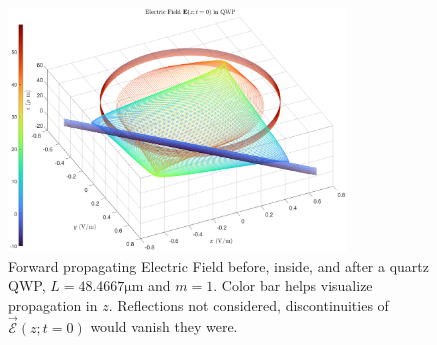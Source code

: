 \documentclass[aspectratio=169,t,xcolor=table]{beamer}
\newcommand{\bv}[1]{\mathbf{#1}}
\begin{document}
        \begin{frame}
            \vspace{-0.7em}
            \begin{figure}[H]
                \centering
                \includegraphics[width=0.8\textwidth]{figs/EfieldInQWP3.png}
                \vspace{-0.7em}
                \caption{
                    Forward propagating Electric Field before, inside, and after
                    a quartz QWP, $L = 48.4667\si{\micro \meter}$ and 
                    $m=1$. Color bar helps visualize propagation in $z$.
                    Reflections not considered, discontinuities of 
                    $\vec{\mathscr{E}}(z; t= 0)$ would vanish they were.
                }
                \label{fig:Q_QWP}
            \end{figure}
        \end{frame}

\end{document}
